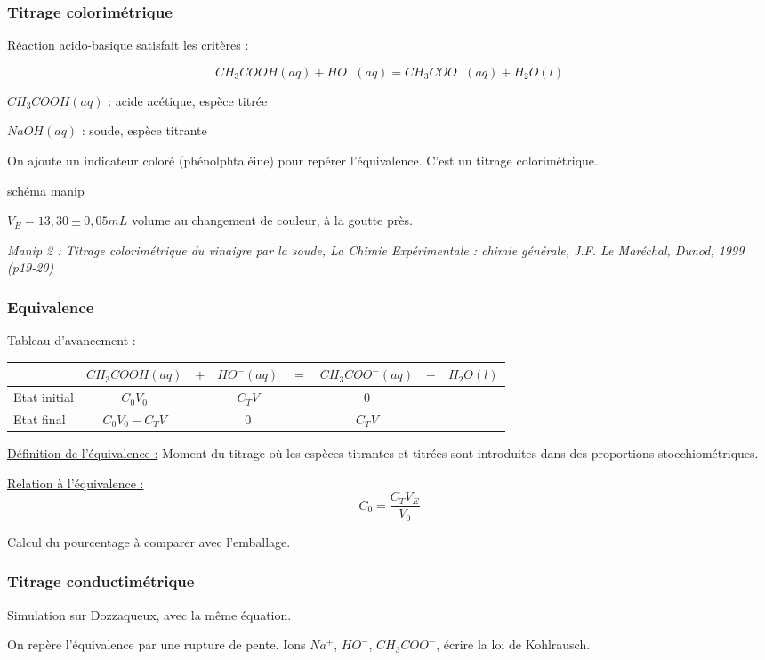 \documentclass{article}%
\begin{document}
\subsubsection{Titrage colorimétrique}

Réaction acido-basique satisfait les critères :

\[CH_3COOH(aq) + HO^-(aq) = CH_3COO^-(aq) + H_2O(l)\]

$CH_3COOH(aq)$ : acide acétique, espèce titrée

$NaOH(aq)$ : soude, espèce titrante

On ajoute un indicateur coloré (phénolphtaléine) pour repérer l'équivalence. C'est un titrage colorimétrique.

schéma manip

$V_E = 13,30 \pm 0,05 mL$ volume au changement de couleur, à la goutte près.

\textit{Manip 2 : Titrage colorimétrique du vinaigre par la soude, La Chimie Expérimentale : chimie générale, J.F. Le Maréchal, Dunod, 1999 (p19-20)}
\subsubsection{Equivalence}

Tableau d'avancement :

\begin{tabular}{l|ccccccc}
&$CH_3COOH(aq)$&$+$&$HO^-(aq)$&$=$&$CH_3COO^-(aq)$&$+$&$H_2O(l)$\\
\hline
Etat initial& $C_0 V_0$&& $C_T V$ && $0$ &\\
Etat final& $C_0 V_0-C_T V$&& $0$ && $C_T V$&\\
\hline

\end{tabular}

\underline{Définition de l'équivalence :} Moment du titrage où les espèces titrantes et titrées sont introduites dans des proportions stoechiométriques.

\underline{Relation à l'équivalence :} \[C_0 = \frac{C_T V_E}{V_0}\]

Calcul du pourcentage à comparer avec l'emballage.


\subsubsection{Titrage conductimétrique}
Simulation sur Dozzaqueux, avec la même équation.

On repère l'équivalence par une rupture de pente. Ions $Na^+$, $HO^-$, $CH_3COO^-$, écrire la loi de Kohlrausch.
\end{document}
